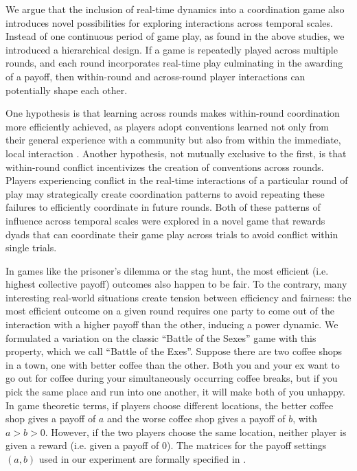 \documentclass[10pt,letterpaper]{article}
\begin{document}
We argue that the inclusion of real-time dynamics into a coordination game also introduces novel possibilities for exploring interactions across temporal scales. Instead of one continuous period of game play, as found in the above studies, we introduced a hierarchical design. If a game is repeatedly played across multiple rounds, and each round incorporates real-time play culminating in the awarding of a payoff, then within-round and across-round player interactions can potentially shape each other. 

One hypothesis is that learning across rounds makes within-round coordination more efficiently achieved, as players adopt conventions learned not only from their general experience with a community \cite{JacksonXing14_CultureDependentStrategies} but also from within the immediate, local interaction \cite{FreyGoldstone13_CyclicGameDynamics, GarrodAnderson87_SayingWhatYouMean, BrennanClark96_ConceptualPactsConversation}. Another hypothesis, not mutually exclusive to the first, is that within-round conflict incentivizes the creation of conventions across rounds. Players experiencing conflict in the real-time interactions of a particular round of play may strategically create coordination patterns to avoid repeating these failures to efficiently coordinate in future rounds.  Both of these patterns of influence across temporal scales were explored in a novel game that rewards dyads that can coordinate their game play across trials to avoid conflict within single trials.

In games like the prisoner's dilemma or the stag hunt, the most efficient (i.e. highest collective payoff) outcomes also happen to be fair.  To the contrary, many interesting real-world situations create tension between efficiency and fairness: the most efficient outcome on a given round requires one party to come out of the interaction with a higher payoff than the other, inducing a power dynamic. We formulated a variation on the classic ``Battle of the Sexes'' game with this property, which we call ``Battle of the Exes''. Suppose there are two coffee shops in a town, one with better coffee than the other. Both you and your ex want to go out for coffee during your simultaneously occurring coffee breaks, but if you pick the same place and run into one another, it will make both of you unhappy. In game theoretic terms, if players choose different locations, the better coffee shop gives a payoff of $a$ and the worse coffee shop gives a payoff of $b$, with $a > b > 0$. However, if the two players choose the same location, neither player is given a reward (i.e. given a payoff of 0). The matrices for the payoff settings $(a,b)$ used in our experiment are formally specified in . 
\end{document}
